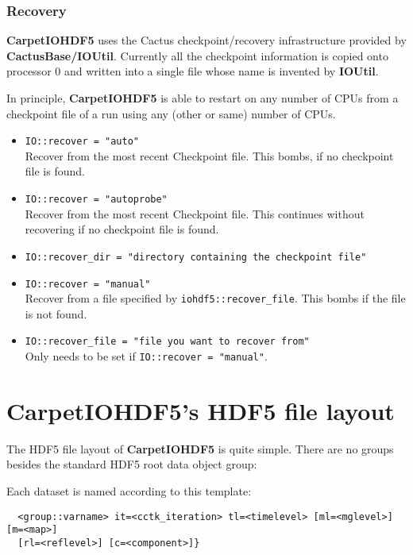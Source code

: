 \subsubsection{Recovery}

{\bf CarpetIOHDF5} uses the Cactus checkpoint/recovery infrastructure provided
by {\bf CactusBase/IOUtil}.
Currently all the checkpoint information is copied onto processor 0 and
written into a single file whose name is invented by {\bf IOUtil}.

In principle, {\bf CarpetIOHDF5} is able to restart on any number of CPUs
from a checkpoint file of a run using any (other or same) number of CPUs.

\begin{itemize}
  \item {\tt IO::recover = "auto"}\\
        Recover from the most recent Checkpoint file. This bombs,
    if no checkpoint file is found.
  \item {\tt IO::recover = "autoprobe"}\\
        Recover from the most recent Checkpoint file. This continues
    without recovering if no checkpoint file is found.
  \item {\tt IO::recover\_dir = "directory containing the checkpoint file"} 
  \item {\tt IO::recover = "manual"}\\
        Recover from a file specified by {\tt iohdf5::recover\_file}. This
     bombs if the file is not found.
  \item {\tt IO::recover\_file = "file you want to recover from"}\\
        Only needs to be set if {\tt IO::recover = "manual"}.
\end{itemize}


\section{CarpetIOHDF5's HDF5 file layout}

The HDF5 file layout of {\bf CarpetIOHDF5} is quite simple.
There are no groups besides the standard HDF5 root data object group:

Each dataset is named according to this template:

\begin{verbatim}
  <group::varname> it=<cctk_iteration> tl=<timelevel> [ml=<mglevel>] [m=<map>]
  [rl=<reflevel>] [c=<component>]}
\end{verbatim}

